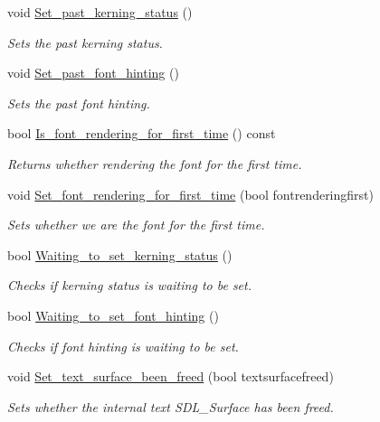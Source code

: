 \begin{DoxyCompactItemize}
void \hyperlink{classjetfuel_1_1draw_1_1Text_a98b604584ef64a98b148add202334c8b}{Set\+\_\+past\+\_\+kerning\+\_\+status} ()
\begin{DoxyCompactList}\small\item\em Sets the past kerning status. \end{DoxyCompactList}\item 
void \hyperlink{classjetfuel_1_1draw_1_1Text_af867aba4f3951b99bc23f3bf8d7cf201}{Set\+\_\+past\+\_\+font\+\_\+hinting} ()
\begin{DoxyCompactList}\small\item\em Sets the past font hinting. \end{DoxyCompactList}\item 
bool \hyperlink{classjetfuel_1_1draw_1_1Text_a007454f20452791fe80f981e45fab1d7}{Is\+\_\+font\+\_\+rendering\+\_\+for\+\_\+first\+\_\+time} () const
\begin{DoxyCompactList}\small\item\em Returns whether rendering the font for the first time. \end{DoxyCompactList}\item 
void \hyperlink{classjetfuel_1_1draw_1_1Text_ac5bcf85ef9195b5bba77441eeddf2f6c}{Set\+\_\+font\+\_\+rendering\+\_\+for\+\_\+first\+\_\+time} (bool fontrenderingfirst)
\begin{DoxyCompactList}\small\item\em Sets whether we are the font for the first time. \end{DoxyCompactList}\item 
bool \hyperlink{classjetfuel_1_1draw_1_1Text_ac3037b299f5e398da3c1bf52fdfa3d00}{Waiting\+\_\+to\+\_\+set\+\_\+kerning\+\_\+status} ()
\begin{DoxyCompactList}\small\item\em Checks if kerning status is waiting to be set. \end{DoxyCompactList}\item 
bool \hyperlink{classjetfuel_1_1draw_1_1Text_a33158c6a5dfedf26cb0526388c347e93}{Waiting\+\_\+to\+\_\+set\+\_\+font\+\_\+hinting} ()
\begin{DoxyCompactList}\small\item\em Checks if font hinting is waiting to be set. \end{DoxyCompactList}\item 
void \hyperlink{classjetfuel_1_1draw_1_1Text_acc627c1cda5f466255b1899cd9477a75}{Set\+\_\+text\+\_\+surface\+\_\+been\+\_\+freed} (bool textsurfacefreed)
\begin{DoxyCompactList}\small\item\em Sets whether the internal text S\+D\+L\+\_\+\+Surface has been freed. \end{DoxyCompactList}\item 

\end{DoxyCompactItemize}

